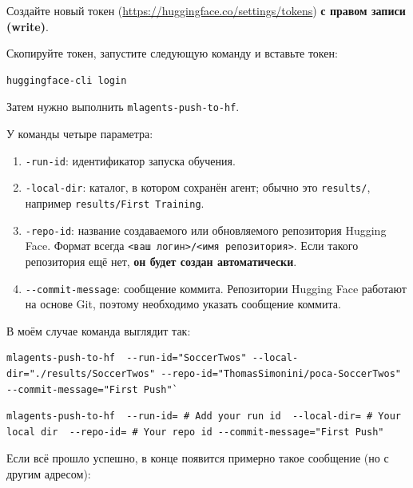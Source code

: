 \documentclass[11pt,a4paper]{article}
\begin{document}
Создайте новый токен (\url{https://huggingface.co/settings/tokens}) \textbf{с правом записи (write)}.


Скопируйте токен, запустите следующую команду и вставьте токен:

\begin{lstlisting}
huggingface-cli login
\end{lstlisting}

Затем нужно выполнить \texttt{mlagents-push-to-hf}.

У команды четыре параметра:

\begin{enumerate}
\def\labelenumi{\arabic{enumi}.}
\item
  \texttt{-run-id}: идентификатор запуска обучения.
\item
  \texttt{-local-dir}: каталог, в котором сохранён агент; обычно это \texttt{results/}, например \texttt{results/First Training}.
\item
  \texttt{-repo-id}: название создаваемого или обновляемого репозитория Hugging Face. Формат всегда \texttt{\textless{}ваш\ логин\textgreater{}/\textless{}имя\ репозитория\textgreater{}}. Если такого репозитория ещё нет, \textbf{он будет создан автоматически}.
\item
  \texttt{-\/-commit-message}: сообщение коммита. Репозитории Hugging Face работают на основе Git, поэтому необходимо указать сообщение коммита.
\end{enumerate}

В моём случае команда выглядит так:

\begin{lstlisting}
mlagents-push-to-hf  --run-id="SoccerTwos" --local-dir="./results/SoccerTwos" --repo-id="ThomasSimonini/poca-SoccerTwos" --commit-message="First Push"`
\end{lstlisting}

\begin{lstlisting}
mlagents-push-to-hf  --run-id= # Add your run id  --local-dir= # Your local dir  --repo-id= # Your repo id --commit-message="First Push"
\end{lstlisting}

Если всё прошло успешно, в конце появится примерно такое сообщение (но с другим адресом):
\end{document}
